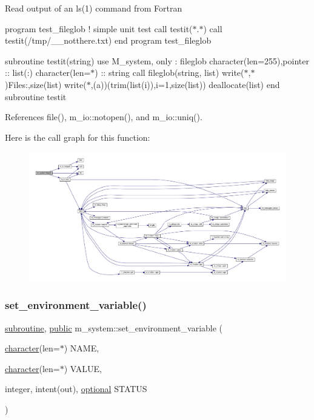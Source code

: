 Read output of an ls(1) command from Fortran

program test\+\_\+fileglob ! simple unit test call testit(\textquotesingle{}$\ast$.$\ast$\textquotesingle{}) call testit(\textquotesingle{}/tmp/\+\_\+\+\_\+notthere.txt\textquotesingle{}) end program test\+\_\+fileglob

subroutine testit(string) use M\+\_\+system, only \+: fileglob character(len=255),pointer \+:\+: list(\+:) character(len=$\ast$) \+:\+: string call fileglob(string, list) write($\ast$,$\ast$)\textquotesingle{}Files\+:\textquotesingle{},size(list) write($\ast$,\textquotesingle{}(a)\textquotesingle{})(trim(list(i)),i=1,size(list)) deallocate(list) end subroutine testit 

References file(), m\+\_\+io\+::notopen(), and m\+\_\+io\+::uniq().

Here is the call graph for this function\+:
\nopagebreak
\begin{figure}[H]
\begin{center}
\leavevmode
\includegraphics[width=350pt]{namespacem__system_a79656f76ad75168302e0d770052e901e_cgraph}
\end{center}
\end{figure}
\mbox{\label{namespacem__system_ad813765403a5d9d6fb7a2edcb669fe4b}} 
\subsubsection{\texorpdfstring{set\+\_\+environment\+\_\+variable()}{set\_environment\_variable()}}
{\footnotesize\ttfamily \hyperlink{M__stopwatch_83_8txt_acfbcff50169d691ff02d4a123ed70482}{subroutine}, \hyperlink{M__stopwatch_83_8txt_a2f74811300c361e53b430611a7d1769f}{public} m\+\_\+system\+::set\+\_\+environment\+\_\+variable (\begin{DoxyParamCaption}\item[{\hyperlink{option__stopwatch_83_8txt_abd4b21fbbd175834027b5224bfe97e66}{character}(len=$\ast$)}]{N\+A\+ME,  }\item[{\hyperlink{option__stopwatch_83_8txt_abd4b21fbbd175834027b5224bfe97e66}{character}(len=$\ast$)}]{V\+A\+L\+UE,  }\item[{integer, intent(out), \hyperlink{option__stopwatch_83_8txt_aa4ece75e7acf58a4843f70fe18c3ade5}{optional}}]{S\+T\+A\+T\+US }\end{DoxyParamCaption})}



